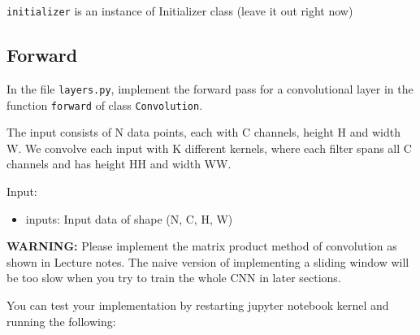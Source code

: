 \documentclass[11pt]{article}
\providecommand{\tightlist}{%
      \setlength{\itemsep}{0pt}\setlength{\parskip}{0pt}}
\begin{document}
\texttt{initializer} is an instance of Initializer class (leave it out
right now)

    \subsection{Forward}\label{forward}

In the file \texttt{layers.py}, implement the forward pass for a
convolutional layer in the function \texttt{forward} of class
\texttt{Convolution}.

The input consists of N data points, each with C channels, height H and
width W. We convolve each input with K different kernels, where each
filter spans all C channels and has height HH and width WW.

Input:

\begin{itemize}
\tightlist
\item
  inputs: Input data of shape (N, C, H, W)
\end{itemize}

\textbf{WARNING:} Please implement the matrix product method of
convolution as shown in Lecture notes. The naive version of implementing
a sliding window will be too slow when you try to train the whole CNN in
later sections.

You can test your implementation by restarting jupyter notebook kernel
and running the following:
\end{document}
